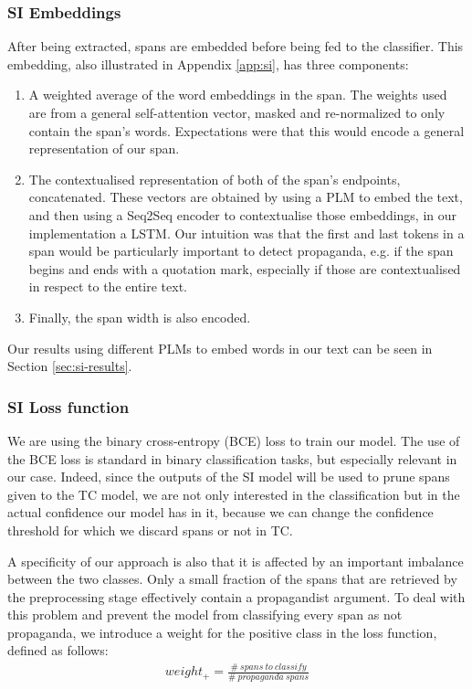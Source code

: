 \documentclass[11pt]{article}
\newcommand{\pol}[1]{{\fontfamily{pcr}\selectfont#1}}
\begin{document}
\subsubsection{\pol{SI} Embeddings} \label{sec:si:embedding}
After being extracted, spans are embedded before being fed to the classifier. This embedding, also illustrated in Appendix \ref{app:si}, has three components:
\begin{enumerate}
    \item A weighted average of the word embeddings in the span. The weights used are from a general self-attention vector, masked and re-normalized to only contain the span's words. Expectations were that this would encode a general representation of our span.
    \item The contextualised representation of both of the span's endpoints, concatenated. These vectors are obtained by using a \pol{PLM} to embed the text, and then using a Seq2Seq encoder to contextualise those embeddings, in our implementation a \pol{LSTM}. Our intuition was that the first and last tokens in a span would be particularly important to detect propaganda, e.g. if the span begins and ends with a quotation mark, especially if those are contextualised in respect to the entire text.
    \item Finally, the span width is also encoded.
\end{enumerate}

Our results using different \pol{PLMs} to embed words in our text can be seen in Section \ref{sec:si-results}.

\subsubsection{\pol{SI} Loss function}
We are using the binary cross-entropy (BCE) loss to train our model. The use of the BCE loss is standard in binary classification tasks, but especially relevant in our case. Indeed, since the outputs of the \pol{SI} model will be used to prune spans given to the \pol{TC} model, we are not only interested in the classification but in the actual confidence our model has in it, because we can change the confidence threshold for which we discard spans or not in \pol{TC}. 

A specificity of our approach is also that it is affected by an important imbalance between the two classes. Only a small fraction of the spans that are retrieved by the preprocessing stage effectively contain a propagandist argument. To deal with this problem and prevent the model from classifying every span as not propaganda, we introduce a weight for the positive class in the loss function, defined as follows:
\begin{align*}
    weight_{+} = \frac{\#\ spans\ to\ classify}{\#\ propaganda\ spans}
\end{align*}
\end{document}
